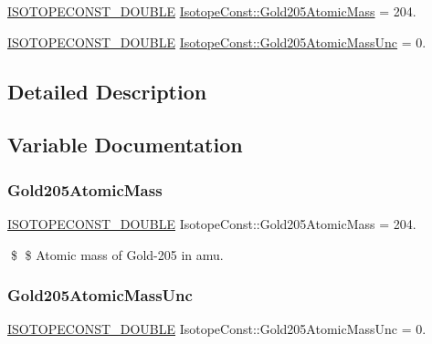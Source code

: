 \begin{DoxyCompactItemize}
\item 
\mbox{\hyperlink{group___isotope_const-_macros_ga8f45a7272ce02c0b4c65c44636ed719a}{I\+S\+O\+T\+O\+P\+E\+C\+O\+N\+S\+T\+\_\+\+D\+O\+U\+B\+LE}} \mbox{\hyperlink{group___isotope_const-_gold-_au205_ga1d6b6b31e2ce4874c56c6128ace2154a}{Isotope\+Const\+::\+Gold205\+Atomic\+Mass}} = 204.
\item 
\mbox{\hyperlink{group___isotope_const-_macros_ga8f45a7272ce02c0b4c65c44636ed719a}{I\+S\+O\+T\+O\+P\+E\+C\+O\+N\+S\+T\+\_\+\+D\+O\+U\+B\+LE}} \mbox{\hyperlink{group___isotope_const-_gold-_au205_gaa4ec6bc068eb1a7a5385eb1c63136e6f}{Isotope\+Const\+::\+Gold205\+Atomic\+Mass\+Unc}} = 0.
\end{DoxyCompactItemize}


\subsection{Detailed Description}


\subsection{Variable Documentation}
\mbox{\label{group___isotope_const-_gold-_au205_ga1d6b6b31e2ce4874c56c6128ace2154a}} 
\subsubsection{\texorpdfstring{Gold205\+Atomic\+Mass}{Gold205AtomicMass}}
{\footnotesize\ttfamily \mbox{\hyperlink{group___isotope_const-_macros_ga8f45a7272ce02c0b4c65c44636ed719a}{I\+S\+O\+T\+O\+P\+E\+C\+O\+N\+S\+T\+\_\+\+D\+O\+U\+B\+LE}} Isotope\+Const\+::\+Gold205\+Atomic\+Mass = 204.}

\$ \$ Atomic mass of Gold-\/205 in amu. \mbox{\label{group___isotope_const-_gold-_au205_gaa4ec6bc068eb1a7a5385eb1c63136e6f}} 
\subsubsection{\texorpdfstring{Gold205\+Atomic\+Mass\+Unc}{Gold205AtomicMassUnc}}
{\footnotesize\ttfamily \mbox{\hyperlink{group___isotope_const-_macros_ga8f45a7272ce02c0b4c65c44636ed719a}{I\+S\+O\+T\+O\+P\+E\+C\+O\+N\+S\+T\+\_\+\+D\+O\+U\+B\+LE}} Isotope\+Const\+::\+Gold205\+Atomic\+Mass\+Unc = 0.}


